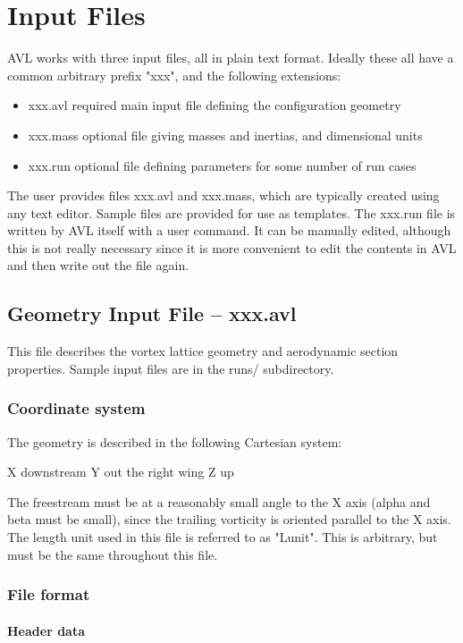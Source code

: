\chapter{Input Files}
AVL works with three input files, all in plain text format.  Ideally 
these all have a common arbitrary prefix "xxx", and the following extensions:
\begin{itemize}
	\item xxx.avl     required main input file defining the configuration geometry
	\item xxx.mass    optional file giving masses and inertias, and dimensional units
	\item xxx.run     optional file defining parameters for some number of run cases
\end{itemize}
The user provides files xxx.avl and xxx.mass, which are typically created
using any text editor.  Sample files are provided for use as templates.
The xxx.run file is written by AVL itself with a user command.
It can be manually edited, although this is not really necessary
since it is more convenient to edit the contents in AVL and then
write out the file again.

\section{Geometry Input File -- xxx.avl}
This file describes the vortex lattice geometry and aerodynamic 
section properties.  Sample input files are in the runs/ subdirectory.
\subsection{Coordinate system}

The geometry is described in the following Cartesian system:

X   downstream
Y   out the right wing
Z   up

The freestream must be at a reasonably small angle to the X axis
(alpha and beta must be small), since the trailing vorticity 
is oriented parallel to the X axis.  The length unit used in
this file is referred to as "Lunit".  This is arbitrary, 
but must be the same throughout this file.  


\subsection{File format}
%
\subsubsection{Header data}

